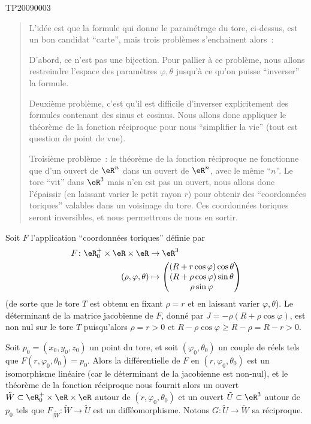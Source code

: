 \begin{corrige}{TP20090003}
\begin{quote}
  L'idée est que la formule qui donne le paramétrage du tore,
  ci-dessus, est un bon candidat ``carte'', mais trois problèmes
  s'enchainent alors~:

  D'abord, ce n'est pas une bijection. Pour pallier à ce problème,
  nous allons restreindre l'espace des paramètres $\varphi,\theta$
  jusqu'à ce qu'on puisse ``inverser'' la formule.

  Deuxième problème, c'est qu'il est difficile d'inverser
  explicitement des formules contenant des sinus et cosinus. Nous
  allons donc appliquer le théorème de la fonction réciproque pour
  nous ``simplifier la vie'' (tout est question de point de vue).

  Troisième problème~: le théorème de la fonction réciproque ne
  fonctionne que d'un ouvert de $\eR^n$ dans un ouvert de $\eR^n$,
  avec le même ``$n$''. Le tore ``vit'' dans $\eR^3$ mais n'en est pas un
  ouvert, nous allons donc l'épaissir (en laissant varier le petit
  rayon $r$) pour obtenir des ``coordonnées toriques'' valables dans
  un voisinage du tore. Ces coordonnées toriques seront inversibles,
  et nous permettrons de nous en sortir.
\end{quote}

Soit $F$ l'application ``coordonnées toriques'' définie par
\begin{equation}
	\begin{aligned}
		F\colon \eR_0^+\times\eR\times\eR&\to \eR^3 \\
		(\rho,\varphi,\theta)&\mapsto \begin{pmatrix}
			(R+r\cos\varphi)\cos\theta	\\ 
			(R+\rho\cos\varphi)\sin\theta	\\ 
			\rho\sin\varphi	
		\end{pmatrix}
	\end{aligned}
\end{equation}
(de sorte que le tore $T$ est obtenu en fixant $\rho = r$ et en
laissant varier $\varphi,\theta$).  Le déterminant de la matrice
jacobienne de $F$, donné par $J = -\rho (R+\rho \cos \varphi)$, est
non nul sur le tore $T$ puisqu'alors $\rho = r > 0$ et $R - \rho
\cos\varphi \geq R - \rho = R - r > 0$.

Soit $p_0 = (x_0,y_0,z_0)$ un point du tore, et soit $(\varphi_0,
\theta_0)$ un couple de réels tels que $F(r, \varphi_0, \theta_0) =
p_0$. Alors la différentielle de $F$ en $(r, \varphi_0, \theta_0)$ est un
isomorphisme linéaire (car le déterminant de la jacobienne est
non-nul), et le théorème de la fonction réciproque nous fournit alors
un ouvert $\tilde W \subset \eR^+_0 \times \eR \times \eR$ autour de
$(r, \varphi_0, \theta_0)$ et un ouvert $\tilde U \subset \eR^3$ autour
de $p_0$ tels que $F_{| \tilde W} : \tilde W \to \tilde U$ est un
difféomorphisme. Notons $G : \tilde U \to \tilde W$ sa réciproque.


\end{corrige}
